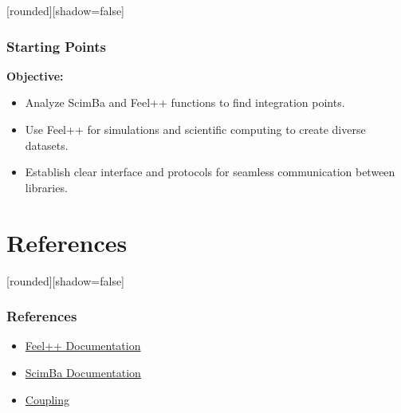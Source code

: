 \documentclass[10pt]{beamer}
\begin{document}

\begin{frame}
    [rounded][shadow=false]
    \frametitle{Starting Points}
    \textbf{Objective:}


    \begin{itemize}
        \item Analyze ScimBa and Feel++ functions to find integration points.
        

        \item Use Feel++ for simulations and scientific computing to create diverse datasets.
        

        \item Establish clear interface and protocols for seamless communication between libraries.
        
        
    \end{itemize}   

\end{frame}



\section{References}
\begin{frame}
    [rounded][shadow=false]
    \frametitle{References}
    \begin{itemize}
    
        \item \href{https://docs.feelpp.org/user/latest/index.html}{Feel++ Documentation}
        
        \item \href{https://sciml.gitlabpages.inria.fr/scimba/}{ScimBa Documentation}

        \item \href{https://en.wikipedia.org/wiki/Coupling_(computer_programming)}{Coupling}
            
    \end{itemize}
\end{frame}
\end{document}
